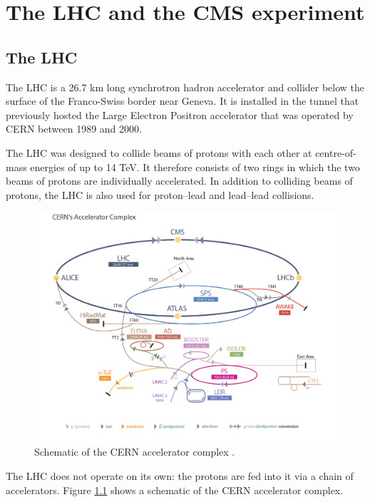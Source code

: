 \chapter{The \acs{LHC} and the \acs{CMS} experiment}
\label{chap:CMSLHC}

\section{The \acs{LHC}}
\label{sec:CMSLHC_LHC}

The \acf{LHC} \cite{lhc-machine}  is a 26.7 km long synchrotron hadron accelerator and collider below the surface of the 
Franco-Swiss border near Geneva. It
is installed in the tunnel that previously hosted the Large Electron Positron accelerator \cite{lep-design}
that was operated by \acf{CERN} between 1989 and 2000.

The \ac{LHC} was designed to collide beams of protons with each other at centre-of-mass
energies of up to 14 TeV. It therefore consists of two rings in which the two beams
of protons are individually accelerated. In addition to colliding beams of protons, the \ac{LHC}
is also used for proton--lead and lead--lead collisions.
\begin{figure}[h!]
\includegraphics[width=\textwidth]{./Detector/Plots/LHC_default.jpg}
\caption[Schematic of the CERN accelerator complex.]{Schematic of the \ac{CERN} accelerator complex \cite{lhc-schematic}.}
\label{fig:lhc_schematic}
\end{figure}
The \ac{LHC} does not operate on its own: the protons are fed into
it via a chain of accelerators. Figure \ref{fig:lhc_schematic} shows a schematic
of the \ac{CERN} accelerator complex.

